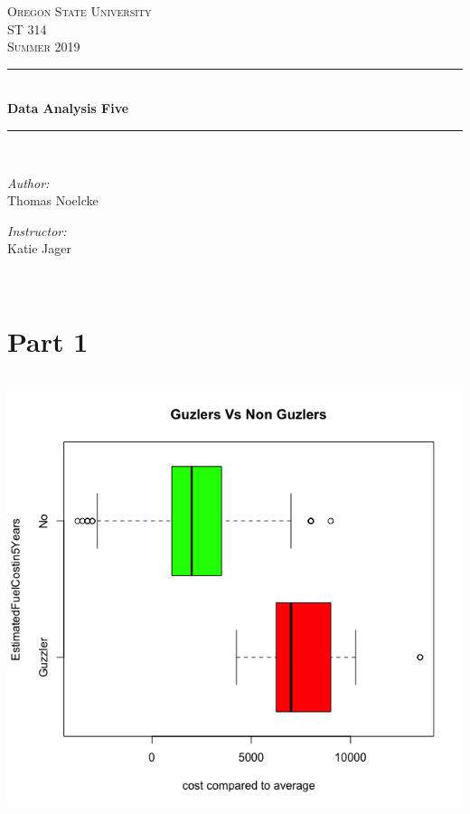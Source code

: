 \documentclass[letterpaper, onecolumn,10pt]{IEEEtran}
\begin{document}
    \begin{titlepage}
    \newcommand{\HRule}{\rule{\linewidth}{0.5mm}}
    \center
    \textsc{\Large Oregon State University}\\[1.5cm]
    \textsc{\Large ST 314}\\[0.5cm]
    \textsc{\Large Summer 2019}\\[0.5cm]
    \HRule \\[0.4cm]
    { \huge \bfseries Data Analysis Five}\\[0.4cm] %
    \HRule \\[1.5cm]
    \begin{minipage}{0.4\textwidth}
        \begin{flushleft} \large
        \emph{Author:}\\
        Thomas Noelcke
        \end{flushleft}
    \end{minipage}
    \begin{minipage}{0.4\textwidth}
        \begin{flushright} \large
        \emph{Instructor:} \\
        Katie Jager\\
        \end{flushright}
    \end{minipage}\\[2cm]
		\end{titlepage}
        
        \section{Part 1}
            \subsection{}
            \includegraphics[width=\textwidth]{week5/boxplot1.png}
            
\end{document}
